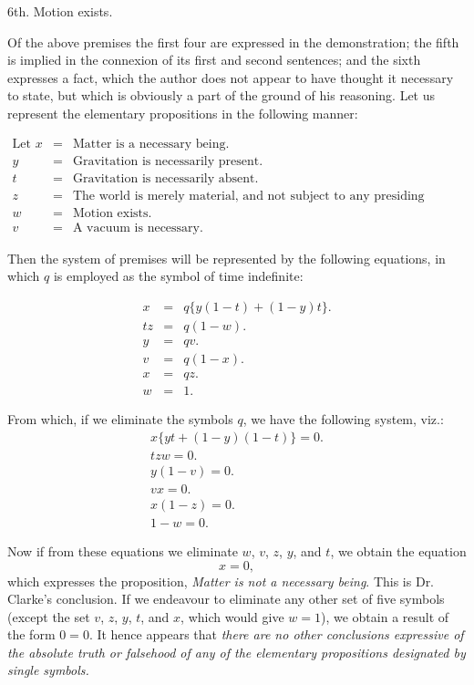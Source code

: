 \documentclass[oneside]{book}
\begin{document}
6th. Motion exists.

Of the above premises the first four are expressed in the
demonstration; the fifth is implied in the connexion of its first
and second sentences; and the sixth expresses a fact, which the
author does not appear to have thought it necessary to state, but
which is obviously a part of the ground of his reasoning. Let us
represent the elementary propositions in the following manner:

\begin{eqnarray*}
\textrm{Let } x &=& \textrm{Matter is a necessary being.}\\
y &=& \textrm{Gravitation is necessarily present.}\\
t &=& \textrm{Gravitation is necessarily absent.}\\
z &=& \textrm{The world is merely material, and not subject to any
presiding Intelligence.}\\
w &=& \textrm{Motion exists.}\\
v &=& \textrm{A vacuum is necessary.}
\end{eqnarray*}

Then the system of premises will be represented by the following
equations, in which $q$ is employed as the symbol of time
indefinite:

\begin{eqnarray*}
x &=& q\{y(1-t) + (1-y)t\}. \\
tz &=& q(1-w). \\
y &=& qv. \\
v &=& q(1-x). \\
x &=& qz. \\
w &=& 1.
\end{eqnarray*}

From which, if we eliminate the symbols $q$, we have the following
system, viz.:
\setcounter{equation}{0}
\begin{eqnarray}
x\{yt+(1-y)(1-t)\}=0.\\
tzw=0.\\
y(1-v)=0.\\
vx=0.\\
x(1-z)=0.\\
1-w=0.
\end{eqnarray}

Now if from these equations we eliminate $w$, $v$, $z$, $y$, and $t$, we
obtain the equation
\[x = 0,\]
which expresses the proposition, \textit{Matter is not a necessary
being}.
This is Dr. Clarke's conclusion. If we endeavour to
eliminate any other set of five symbols (except the set $v$, $z$, $y$, $t$, and $x$,
which would give $w = 1$), we obtain a result of the form $0=0$.
It hence appears that \textit{there are no other conclusions expressive of
the absolute truth or falsehood of any of the elementary propositions
designated by single symbols.}
\end{document}
